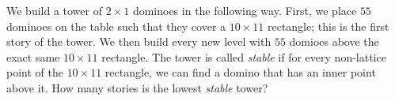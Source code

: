 We build a tower of $2\times 1$ dominoes in the following way. First, we place $55$ dominoes on the table such that they cover a $10\times 11$ rectangle; this is the first story of the tower. We then build every new level with $55$ domioes above the exact same $10\times 11$ rectangle. The tower is called \textit{stable} if for every non-lattice point of the $10\times 11$ rectangle, we can find a domino that has an inner point above it. How many stories is the lowest \textit{stable} tower?
